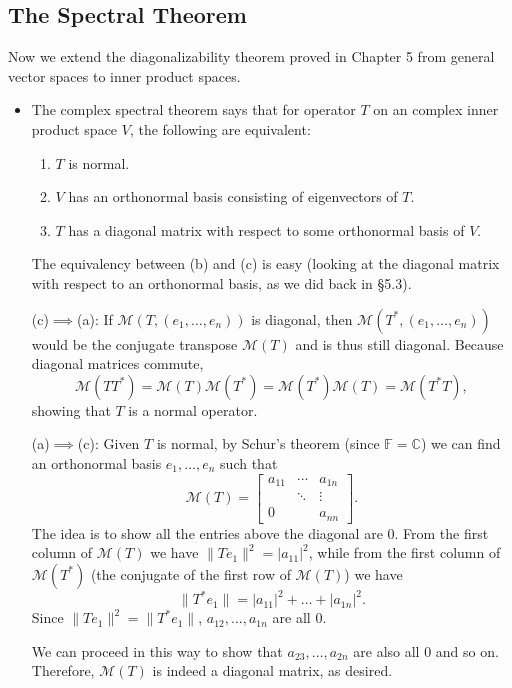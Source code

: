 \documentclass{article}
\newcommand{\C}{\mathbb{C}}
\newcommand{\F}{\mathbb{F}}
\newcommand{\nm}[1]{\| #1 \|}
\newcommand{\M}{\mathcal{M}}
\begin{document}
\subsection{The Spectral Theorem}
Now we extend the diagonalizability theorem proved in Chapter 5 from general vector spaces to inner product spaces. 
\begin{itemize}
    \item The complex spectral theorem says that for operator $T$ on an complex inner product space $V$, the following are equivalent:
    \begin{enumerate}[label=(\alph*)]
        \item $T$ is normal.
        \item $V$ has an orthonormal basis consisting of eigenvectors of $T$.
        \item $T$ has a diagonal matrix with respect to some orthonormal basis of $V$.
    \end{enumerate}
    
    The equivalency between (b) and (c) is easy (looking at the diagonal matrix with respect to an orthonormal basis, as we did back in \S 5.3).
    
    (c)$\implies$(a): If $\M(T,(e_1,\dots,e_n))$ is diagonal, then $\M(T^*,(e_1,\dots,e_n))$ would be the conjugate transpose $\M(T)$ and is thus still diagonal. Because diagonal matrices commute, $$\M(TT^*)=\M(T)\M(T^*)=\M(T^*)\M(T)=\M(T^*T),$$ showing that $T$ is a normal operator.
    
    (a)$\implies$(c): Given $T$ is normal, by Schur's theorem (since $\F = \C$) we can find an orthonormal basis $e_1,\dots,e_n$ such that
    \begin{equation*}
        \M(T)=
        \begin{bmatrix}
            a_{11} & \cdots & a_{1n} \\
            & \ddots & \vdots \\
            0 & & a_{nn}
        \end{bmatrix}.
    \end{equation*}
    The idea is to show all the entries above the diagonal are 0. From the first column of $\M(T)$ we have $\nm{Te_1}^2=|a_{11}|^2$, while from the first column of $\M(T^*)$ (the conjugate of the first row of $\M(T)$) we have $$\nm{T^*e_1}=|a_{11}|^2+\dots+|a_{1n}|^2.$$ Since $\nm{Te_1}^2 = \nm{T^*e_1}$, $a_{12},\dots,a_{1n}$ are all 0.
    
    We can proceed in this way to show that $a_{23},\dots,a_{2n}$ are also all 0 and so on. Therefore, $\M(T)$ is indeed a diagonal matrix, as desired.
\end{itemize}
\end{document}
